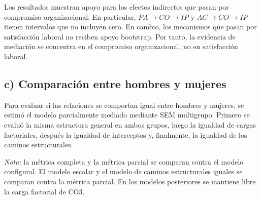 \documentclass[12pt,letterpaper]{article}
\begin{document}
Los resultados muestran apoyo para los efectos indirectos que pasan por compromiso organizacional. En particular, $PA\rightarrow CO\rightarrow IP$ y $AC\rightarrow CO\rightarrow IP$ tienen intervalos que no incluyen cero. En cambio, los mecanismos que pasan por satisfacción laboral no reciben apoyo bootstrap. Por tanto, la evidencia de mediación se concentra en el compromiso organizacional, no en satisfacción laboral.

\subsection{c) Comparación entre hombres y mujeres}

Para evaluar si las relaciones se comportan igual entre hombres y mujeres, se estimó el modelo parcialmente mediado mediante SEM multigrupo. Primero se evaluó la misma estructura general en ambos grupos, luego la igualdad de cargas factoriales, después la igualdad de interceptos y, finalmente, la igualdad de los caminos estructurales.

\begin{table}[H]
\centering
\caption{Pruebas de invariancia multigrupo por género en lavaan}
\end{table}

\noindent\textit{Nota:} la métrica completa y la métrica parcial se comparan contra el modelo configural. El modelo escalar y el modelo de caminos estructurales iguales se comparan contra la métrica parcial. En los modelos posteriores se mantiene libre la carga factorial de CO3.
\end{document}
